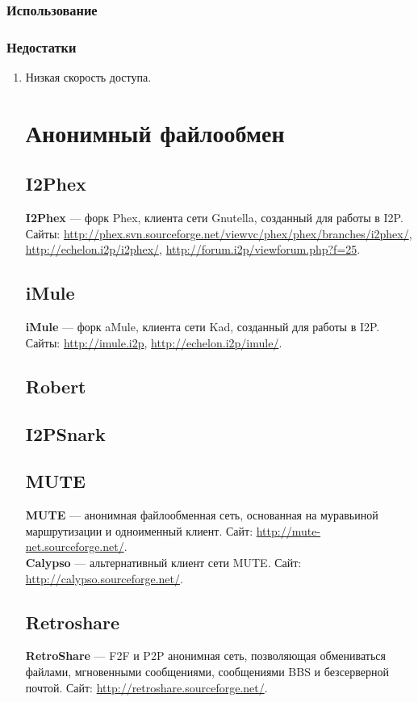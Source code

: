 \subsubsection{Использование}
\subsubsection{Недостатки}
\begin{enumerate}
\item Низкая скорость доступа.

\section{Анонимный файлообмен}
\subsection{I2Phex}
\textbf{I2Phex} --- форк Phex, клиента сети Gnutella, созданный для работы в I2P. Сайты: \url{http://phex.svn.sourceforge.net/viewvc/phex/phex/branches/i2phex/}, \url{http://echelon.i2p/i2phex/}, \url{http://forum.i2p/viewforum.php?f=25}.
\subsection{iMule}
\textbf{iMule} --- форк aMule, клиента сети Kad, созданный для работы в I2P. Сайты: \url{http://imule.i2p}, \url{http://echelon.i2p/imule/}.
\subsection{Robert}
\subsection{I2PSnark}
\subsection{MUTE}
\textbf{MUTE} --- анонимная файлообменная сеть, основанная на муравьиной маршрутизации и одноименный клиент. Сайт: \url{http://mute-net.sourceforge.net/}.\\
\textbf{Calypso} --- альтернативный клиент сети MUTE. Сайт: \url{http://calypso.sourceforge.net/}.
\subsection{Retroshare}
\textbf{RetroShare} --- F2F и P2P анонимная сеть, позволяющая обмениваться файлами, мгновенными сообщениями, сообщениями BBS и безсерверной почтой. Сайт: \url{http://retroshare.sourceforge.net/}.


\end{enumerate}
